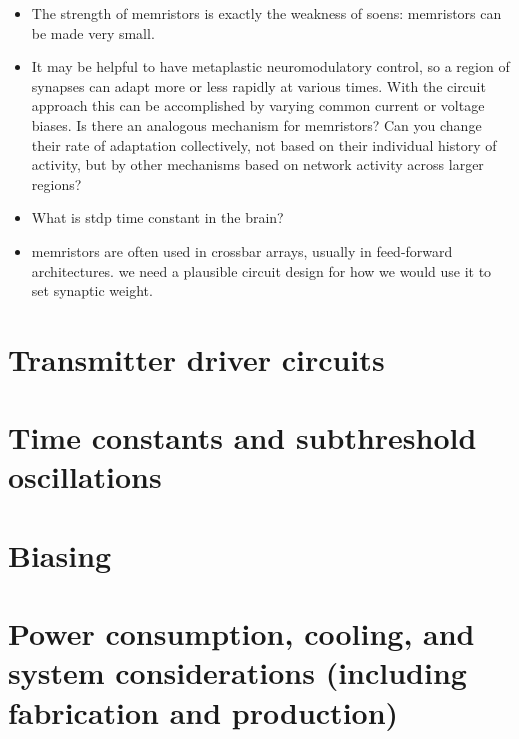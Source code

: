 \documentclass[onecolumn]{article}
\begin{document}
\begin{itemize}
\item The strength of memristors is exactly the weakness of soens: memristors can be made very small.

\item It may be helpful to have metaplastic neuromodulatory control, so a region of synapses can adapt more or less rapidly at various times. With the circuit approach this can be accomplished by varying common current or voltage biases. Is there an analogous mechanism for memristors? Can you change their rate of adaptation collectively, not based on their individual history of activity, but by other mechanisms based on network activity across larger regions?

\item What is stdp time constant in the brain?

\item memristors are often used in crossbar arrays, usually in feed-forward architectures. we need a plausible circuit design for how we would use it to set synaptic weight.

\end{itemize}

\section{\label{sec:transmitters}Transmitter driver circuits}

\section{\label{sec:time_constants}Time constants and subthreshold oscillations}

\section{\label{sec:biasing}Biasing}

\section{\label{sec:systems}Power consumption, cooling, and system considerations (including fabrication and production)}

\end{document}
